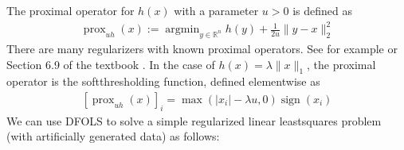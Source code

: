 \documentclass[letterpaper,10pt,english]{sphinxmanual}
\begin{document}
\sphinxAtStartPar
The proximal operator for \(h(x)\) with a parameter \(u>0\) is defined as
\begin{equation*}
\begin{split}\operatorname{prox}_{uh}(x) := \operatorname{argmin}_{y\in\mathbb{R}^n} h(y) + \frac{1}{2u}\|y-x\|_2^2\end{split}
\end{equation*}
\sphinxAtStartPar
There are many regularizers with known proximal operators. See for example 
or Section 6.9 of the textbook .
In the case of \(h(x)=\lambda\|x\|_1\), the proximal operator is the soft\sphinxhyphen{}thresholding function, defined element\sphinxhyphen{}wise as
\begin{equation*}
\begin{split}[\operatorname{prox}_{uh}(x)]_i = \max(|x_i|-\lambda u, 0) \operatorname{sign}(x_i)\end{split}
\end{equation*}
\sphinxAtStartPar
We can use DFO\sphinxhyphen{}LS to solve a simple regularized linear least\sphinxhyphen{}squares problem (with artificially generated data) as follows:
\end{document}

